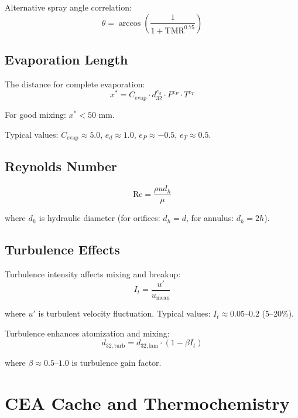 \documentclass[12pt,a4paper]{article}
\begin{document}
Alternative spray angle correlation:
\begin{equation}
\theta = \arccos\left(\frac{1}{1 + \text{TMR}^{0.75}}\right)
\end{equation}

\subsection{Evaporation Length}

The distance for complete evaporation:
\begin{equation}
x^* = C_{\text{evap}} \cdot d_{32}^{e_d} \cdot P^{e_P} \cdot T^{e_T}
\end{equation}

For good mixing: $x^* < 50$ mm.

Typical values: $C_{\text{evap}} \approx 5.0$, $e_d \approx 1.0$, $e_P \approx -0.5$, $e_T \approx 0.5$.

\subsection{Reynolds Number}

\begin{equation}
\text{Re} = \frac{\rho u d_h}{\mu}
\end{equation}

where $d_h$ is hydraulic diameter (for orifices: $d_h = d$, for annulus: $d_h = 2h$).

\subsection{Turbulence Effects}

Turbulence intensity affects mixing and breakup:
\begin{equation}
I_t = \frac{u'}{u_{\text{mean}}}
\end{equation}

where $u'$ is turbulent velocity fluctuation. Typical values: $I_t \approx 0.05$--$0.2$ (5--20\%).

Turbulence enhances atomization and mixing:
\begin{equation}
d_{32,\text{turb}} = d_{32,\text{lam}} \cdot (1 - \beta I_t)
\end{equation}

where $\beta \approx 0.5$--$1.0$ is turbulence gain factor.

\section{CEA Cache and Thermochemistry}
\end{document}
